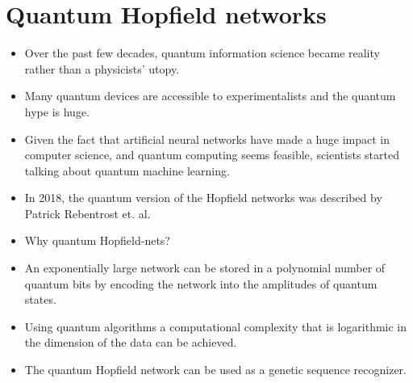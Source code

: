 \documentclass[12pt]{article}
\numberwithin{equation}{section}
\begin{document}
\newpage
\section*{Quantum Hopfield networks}
\begin{itemize}
    \item Over the past few decades, quantum information science became reality rather than a physicists' utopy.
    \item Many quantum devices are accessible to experimentalists and the quantum hype is huge.
    \item Given the fact that artificial neural networks have made a huge impact in computer science,
    and quantum computing seems feasible, scientists started talking about quantum machine learning.
    \item In 2018, the quantum version of the Hopfield networks was described by Patrick Rebentrost et. al. \cite{quantum-hopfield}
    \item Why quantum Hopfield-nets?
    \item An exponentially large network can be stored in a polynomial number of quantum bits by encoding the network into the amplitudes of quantum states.
    \item Using quantum algorithms a computational complexity that is logarithmic in the dimension of the data can be achieved.
    \item The quantum Hopfield network can be used as a genetic sequence recognizer.
\end{itemize}

\newpage
\end{document}
